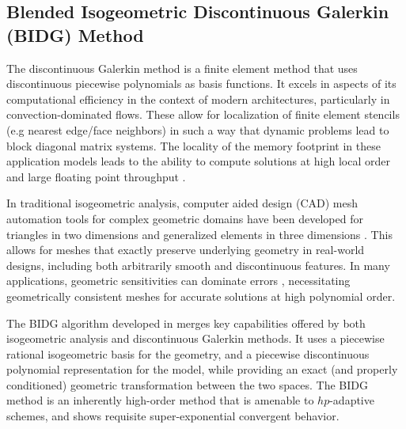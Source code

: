 \subsection{Blended Isogeometric Discontinuous Galerkin (BIDG) Method}
\label{sec:isogeometric}

The discontinuous Galerkin method is a finite element method that uses
discontinuous piecewise polynomials as basis functions.  It excels in
aspects of its computational efficiency in the context of modern architectures,
particularly in convection-dominated flows.  These allow for localization of
finite element stencils (e.g nearest edge/face neighbors) in such a way that dynamic problems lead to block
diagonal matrix systems.  The locality of the memory footprint in these
application models leads to the ability to compute solutions at high local
order and large floating point throughput \cite{Klockner20097863}.

In traditional isogeometric analysis, computer aided design (CAD) mesh
automation tools for complex geometric domains have been developed for
triangles in two dimensions \cite{Engvall2016378} and generalized elements in
three dimensions \cite{EngvallPress}.  This allows for meshes that exactly
preserve underlying geometry in real-world designs, including both arbitrarily
smooth and discontinuous features.  In many applications, geometric
sensitivities can dominate errors \cite{Michoski2016658,Wirasaet2015597},
necessitating geometrically consistent meshes for accurate solutions at high
polynomial order.

The BIDG algorithm developed in \cite{Michoski2016658} merges key capabilities
offered by both isogeometric analysis and discontinuous Galerkin methods.  It
uses a piecewise rational isogeometric basis for the geometry, and a piecewise
discontinuous polynomial representation for the model, while providing an exact
(and properly conditioned) geometric transformation between the two spaces. The
BIDG method is an inherently high-order method that is amenable to
$hp$-adaptive schemes, and shows requisite super-exponential convergent
behavior.

